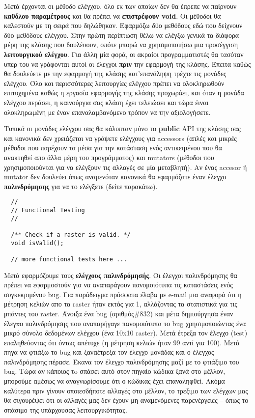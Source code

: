 Μετά έρχονται οι μέθοδο ελέγχου, όλο εκ των οποίων δεν θα έπρεπε να παίρνουν \textbf{καθόλου παραμέτρους} και θα πρέπει να \textbf{επιστρέφουν void}. Οι μέθοδοι θα καλεστούν με τη σειρά που δηλώθηκαν. Εφαρμόζω δύο μεθόδους εδώ που δείχνουν δύο μεθόδους ελέγχου. Στην πρώτη περίπτωση θέλω να ελέγξω γενικά τα διάφορα μέρη της κλάσης που δουλέυουν, οπότε μπορώ να χρησιμοποιήσω μια προσέγγιση  \textbf{λειτουργικού ελέγχου}. Για άλλη μία φορά, οι ακραίοι προγραμματιστές θα τασόταν υπερ του να γράφονται αυτοί οι έλεγχοι \textbf{πριν} την εφαρμογή της κλάσης. Έπειτα καθώς θα δουλεύετε με την εφαρμογή της κλάσης κατ'επανάληψη τρέχτε τις μονάδες ελέγχου. Όλο και περισσότερες λειτουργίες ελέγχου πρέπει να ολοκληρωθούν επιτυχημένα καθώς η εργασία εφαρμογής της κλάσης προχωράει, και όταν η μονάδα ελέγχου περάσει, η καινούργια σας κλάση έχει τελειώσει και τώρα έιναι ολοκληρωμένη με έναν επαναλαμβανόμενο τρόπον να την αξιολογήσετε. 

Τυπικά οι μονάδες ελέγχου σας θα κάλυπταν μόνο το \textbf{public} API της κλάσης σας και κανονικά δεν χρειάζεται να γράψετε ελέγχους για accessors (απλές και μικρές μέθοδοι που παρέχουν τα μέσα για την κατάσταση ενός αντικειμένου που θα ανακτηθεί απο άλλα μέρη του προγράμματος) και mutators (μέθοδοι που χρησιμοποιούνται για να ελέγξουν τις αλλαγές σε μία μεταβλητή).  Αν ένας accesor ή mutator δεν δουλεύει όπως αναμενόταν κανονικά θα εφαρμόζατε έναν έλεγχο \textbf{παλινδρόμησης} για να το ελέγξετε (δείτε παρακάτω).

\begin{verbatim}
  //
  // Functional Testing
  //
  
  /** Check if a raster is valid. */
  void isValid();

  // more functional tests here ...
\end{verbatim}

Μετά εφαρμόζουμε τους \textbf{ελέγχους παλινδρόμησής}. Οι έλεγχοι παλινδρόμησης θα πρέπει να εφαρμοστούν για να αναπαράγουν πανομοιότυπα τις καταστάσεις ενός συγκεκριμένου bug. Για παράδειγμα πρόσφατα έλαβα με e-mail μια αναφορά  ότι η μέτρηση κελιών απο τα raster ήταν εκτός για 1, αλλάζοντας τα στατιστικά για τις μπάντες του raster. Άνοιξα ένα bug (αριθμός\#832) και μέτα δημιούργησα έναν έλεγxο παλινδρόμησης που αναπαρήγαγε πανομοιότυπα το bug χρησιμοποιώντας ένα μικρό σύνολο δεδομένων ελέγχου (ένα 10x10 raster). Μετά έτρεξα τον έλεγχο (test) επαληθεύοντας ότι όντως απέτυχε (η μέτρηση κελιών ήταν 99 αντί για 100). Μετά πηγα να φτιάξω το bug και ξαναέτρεξα τον έλεγχο μονάδας και ο έλεγχος παλινδρόμησης πέρασε. Έκανα τον έλεγχο παλινδρόμησης μαζί με το φτιάξιμο του bug. Τώρα αν κάποιος τo σπάσει αυτό στον πηγαίο κώδικα ξανά στο μέλλον, μπορούμε αμέσως να αναγνωρίσουμε ότι ο κώδικας έχει επαναληφθεί. Ακόμα καλύτερα πριν γίνουν οποιεσδήποτε αλλαγές στο μέλλον, το τρεξιμο των ελέγχων μας θα σιγουρέψει ότι οι αλλαγές μας δεν έχουν μη αναμενόμενες παρενέργειες – όπως το σπάσιμο της υπάρχουσας λειτουργικότητας.

